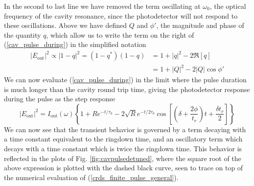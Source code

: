 In the second to last line we have removed the term oscillating at $\omega_0$, the optical frequency of the cavity resonance, since the photodetector will not respond to these oscillations. Above we have defined $Q$ and $\phi'$, the magnitude and phase of the quantity $q$, which allow us to write the term on the right of (\ref{cav_pulse_during}) in the simplified notation
\begin{align*}
	\left|E_\mathrm{out}\right|^2 \propto
	\left|1-q\right|^2 = (1-q^*)(1-q) &= 1 + \left|q\right|^2 - 2\Re \left[q\right] \\
	&= 1 + \left|Q\right|^2 - 2\left|Q\right|\cos\phi'
\end{align*}
We can now evaluate (\ref{cav_pulse_during}) in the limit where the pulse duration is much longer than the cavity round trip time, giving the photodetector response during the pulse as the step response
\begin{equation}\label{cav_pulse_analytic}
	\left|E_\mathrm{out}\right|^2 = I_\mathrm{out}(\omega) \left\{1 + R e^{-t/\tau_0} - 2 \sqrt{R} e^{-t/2\tau_0} \cos\left[\left(\delta + \frac{2\phi}{t_r}\right)t + \frac{\delta t_r}{2}\right]\right\}
\end{equation}
We can now see that the transient behavior is governed by a term decaying with a time constant equivalent to the ringdown time, and an oscillatory term which decays with a time constant which is twice the ringdown time. This behavior is reflected in the plots of Fig. \ref{fig:cavpulsedetuned}, where the square root of the above expression is plotted with the dashed black curve, seen to trace on top of the numerical evaluation of (\ref{crds_finite_pulse_general}).

